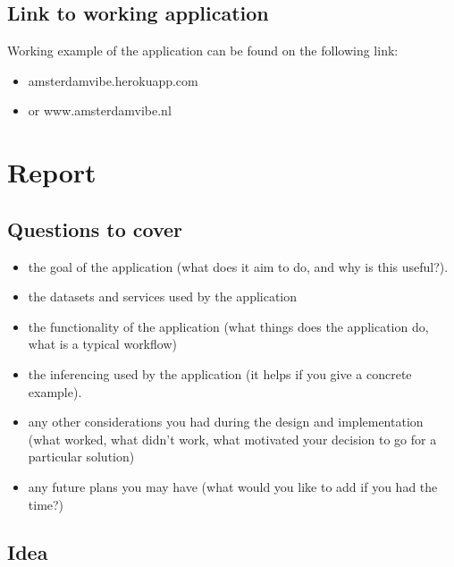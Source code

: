 \documentclass[12pt, a4paper, lithuanian]{article}
\begin{document}
\subsection{Link to working application}

Working example of the application can be found on the following link:

\begin{itemize}

  \item amsterdamvibe.herokuapp.com

  \item or www.amsterdamvibe.nl

\end{itemize}

\section{Report}

\subsection{Questions to cover}

\begin{itemize}
  
    \item the goal of the application (what does it aim to do, and why is this useful?).

    \item the datasets and services used by the application

    \item the functionality of the application (what things does the application do, what is a typical workflow)

    \item the inferencing used by the application (it helps if you give a concrete example).

    \item any other considerations you had during the design and implementation (what worked, what didn't work, what motivated your decision to go for a particular solution)

    \item any future plans you may have (what would you like to add if you had the time?)

\end{itemize}

\subsection{Idea}
\end{document}
